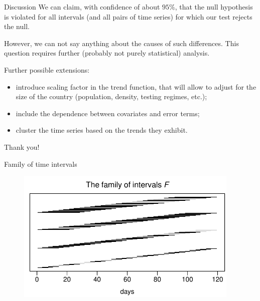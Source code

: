 \documentclass[10pt, handout]{beamer}
\begin{document}
\begin{frame}{Discussion}
We can claim, with confidence of about $95\%$, that the null hypothesis is violated for all intervals (and all pairs of time series) for which our test rejects the null. \pause

However, we can not say anything about the causes of such differences. This question requires further (probably not purely statistical) analysis.\pause

Further possible extensions:
\vspace{-1mm}
\begin{itemize}
	\item introduce scaling factor in the trend function, that will allow to adjust for the size of the country (population, density, testing regimes, etc.);\pause
	\item include the dependence between covariates and error terms;
	\item cluster the time series based on the trends they exhibit.
\end{itemize}
\end{frame}

\begin{frame}[standout]
  Thank you!
\end{frame}


\appendix

\begin{frame}{Family of time intervals}
	\begin{figure}
		\includegraphics[width=0.95\textwidth]{plots/all_intervals}
	\end{figure}
\end{frame}
\end{document}
